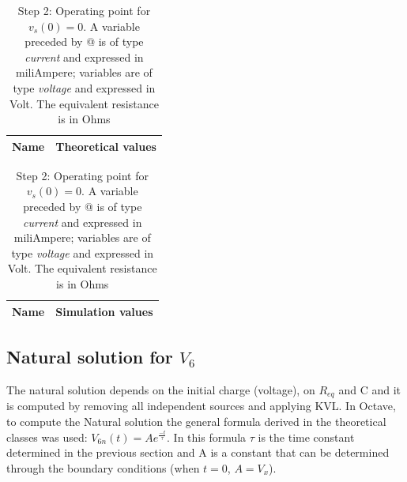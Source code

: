 \begin{table}[H]
\parbox{.40\linewidth}{
  \centering
  \begin{tabular}{|l|r|}
    \hline    
    {\bf Name} & {\bf Theoretical values }\\ \hline
    
  \end{tabular}
  \caption{A variable that starts with a "V" is of type {\it voltage} and expressed in
    Volt (V). The variable $R_{eq}$ is expressed in Ohm and the variable $\tau$ is expressed in seconds }
  \label{tab:equivalent resistor}
}
 \hfill
 \parbox{.35\linewidth}{
  \centering
  \begin{tabular}{|l|r|}
    \hline    
    {\bf Name} & {\bf Simulation values } \\ \hline
    
  \end{tabular}
  \caption{Step 2: Operating point for {\it $v_s(0)=0$}. A variable preceded by @ is of type {\em current}
    and expressed in miliAmpere; variables are of type {\it voltage} and expressed in
    Volt. The equivalent resistance is in Ohms}
  \label{tab:opeq}
  }
\end{table}



\pagebreak
\subsection{Natural solution for $V_6$}

The natural solution depends on the initial charge (voltage), on $R_{eq}$ and C and it is computed by removing all independent sources and applying KVL. In Octave, to compute the Natural solution the general formula derived in the theoretical classes was used: $V_{6n}(t)=Ae^{\frac{-t}{\tau}}$. In this formula $\tau$ is the time constant determined in the previous section and  A is a constant that can be determined through the boundary conditions (when $t=0$, $A=V_x$).

